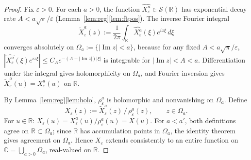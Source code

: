 \documentclass[12pt]{amsart}
\theoremstyle{remark}
\begin{document}
\begin{proof}
Fix $\varepsilon>0$.  For each $a>0$, the function
$\widehat{X_\varepsilon^a}\in\mathcal{S}(\mathbb{R})$ has exponential
decay rate $A<a\sqrt{\pi}/\varepsilon$ (Lemma~\ref{lem:reg}\ref{lem:ftpos}).
The inverse Fourier integral
\[
  \tilde{X}_\varepsilon^a(z)
  := \frac{1}{2\pi}\int_{\mathbb{R}}\widehat{X_\varepsilon^a}(\xi)e^{iz\xi}\,d\xi
\]
converges absolutely on $\Omega_a:=\{|\operatorname{Im}z|<a\}$, because
for any fixed $A<a\sqrt{\pi}/\varepsilon$,
$|\widehat{X_\varepsilon^a}(\xi)e^{iz\xi}|
\leq C_A e^{-(A-|\operatorname{Im}z|)|\xi|}$
is integrable for $|\operatorname{Im}z|<A<a$.  Differentiation under the integral gives
holomorphicity on $\Omega_a$, and Fourier inversion gives
$\tilde{X}_\varepsilon^a(u)=X_\varepsilon^a(u)$ on $\mathbb{R}$.

By Lemma~\ref{lem:reg}\ref{lem:holo}, $\rho_\varepsilon^a$ is holomorphic and
nonvanishing on $\Omega_a$.  Define
\[
  X_\varepsilon(z) := \tilde{X}_\varepsilon^a(z)\,/\,\rho_\varepsilon^a(z),
  \qquad z\in\Omega_a.
\]
For $u\in\mathbb{R}$:
$X_\varepsilon(u)=X_\varepsilon^a(u)/\rho_\varepsilon^a(u)=X(u)$.
For $a<a'$, both definitions agree on $\mathbb{R}\subset\Omega_a$;
since $\mathbb{R}$ has accumulation points in $\Omega_a$, the identity
theorem gives agreement on $\Omega_a$.  Hence $X_\varepsilon$ extends
consistently to an entire function on $\mathbb{C}=\bigcup_{a>0}\Omega_a$,
real-valued on $\mathbb{R}$.


\end{proof}
\end{document}
